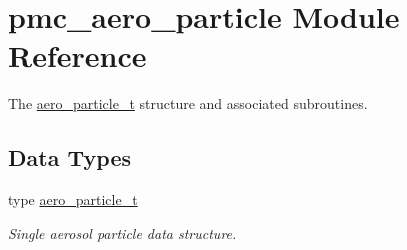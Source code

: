 \hypertarget{namespacepmc__aero__particle}{}\section{pmc\+\_\+aero\+\_\+particle Module Reference}
\label{namespacepmc__aero__particle}


The \mbox{\hyperlink{structpmc__aero__particle_1_1aero__particle__t}{aero\+\_\+particle\+\_\+t}} structure and associated subroutines.  


\subsection*{Data Types}
\begin{DoxyCompactItemize}
\item 
type \mbox{\hyperlink{structpmc__aero__particle_1_1aero__particle__t}{aero\+\_\+particle\+\_\+t}}
\begin{DoxyCompactList}\small\item\em Single aerosol particle data structure. \end{DoxyCompactList}\end{DoxyCompactItemize}
